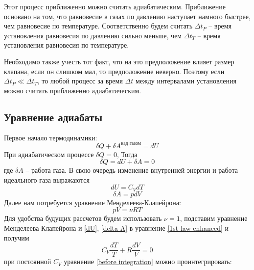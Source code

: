 \documentclass[a4paper,12pt]{article}
\begin{document}
        Этот процесс приближенно можно считать адиабатическим. Приближение основано на том, что равновесие в газах по давлению наступает намного быстрее, чем равновесие по температуре. Соответственно будем считать $\Delta t_P$ -- время установления равновесия по давлению сильно меньше, чем $\Delta t_T$ -- время установления равновесия по температуре.

        Необходимо также учесть тот факт, что на это предположение влияет размер клапана, если он слишком мал, то предположение неверно. Поэтому если $\Delta t_P \ll \Delta t_T$, то любой процесс за время $\Delta t$ между интервалами установления можно считать приближенно адиабатическим.

    \subsection*{Уравнение адиабаты}
        Первое начало термодинамики:
        \begin{equation}
            \label{1st law thermodynamics}
            \delta Q + \delta A^{\text{над газом}}=dU
        \end{equation}
        При адиабатическом процессе $\delta Q = 0$, Тогда 
        \begin{equation}
            \label{1st law enhanced}
            \delta Q = dU+\delta A = 0
        \end{equation}
        где $\delta A$ -- работа газа. В свою очередь изменение внутренней энергии и работа идеального газа выражаются
        \begin{equation}
            dU=C_VdT
            \label{dU}
        \end{equation}
        \begin{equation}
            \delta A=pdV
            \label{delta A}
        \end{equation}
        Далее нам потребуется уравнение Менделеева-Клапейрона:
        \begin{equation}
            pV=\nu RT
            \label{pV}
        \end{equation}
        Для удобства будущих рассчетов будем использовать $\nu = 1$, подставим уравнение Менделеева-Клапейрона и \eqref{dU}, \eqref{delta A} в уравнение \eqref{1st law enhanced} и получим
        \begin{equation}
            C_V\frac{dT}{T}+R\frac{dV}{V}=0
            \label{before integration}
        \end{equation}
        при постоянной $C_V$ уравнение \eqref{before integration} можно проинтегрировать:
\end{document}
